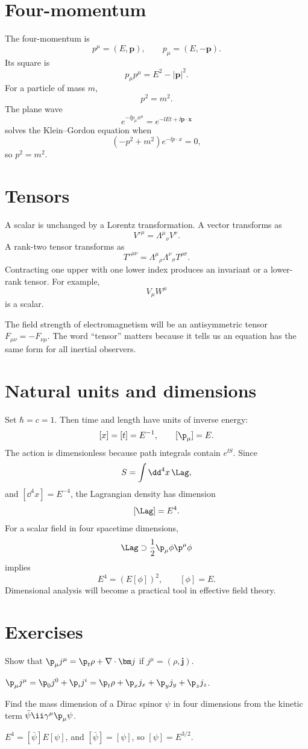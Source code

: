 \section{Four-momentum}

The four-momentum is
\[
  p^\mu=(E,\bm p),\qquad p_\mu=(E,-\bm p).
\]
Its square is
\[
  p_\mu p^\mu=E^2-|\bm p|^2.
\]
For a particle of mass \(m\),
\[
  p^2=m^2.
\]
The plane wave
\[
  e^{-\ii p_\mu x^\mu}=e^{-\ii Et+\ii\bm p\cdot\bm x}
\]
solves the Klein--Gordon equation when
\[
  (-p^2+m^2)e^{-\ii p\cdot x}=0,
\]
so \(p^2=m^2\).

\section{Tensors}

A scalar is unchanged by a Lorentz transformation.  A vector transforms as
\[
  V'^\mu=\Lambda^\mu{}_\nu V^\nu.
\]
A rank-two tensor transforms as
\[
  T'^{\mu\nu}
  =
  \Lambda^\mu{}_\rho\Lambda^\nu{}_\sigma T^{\rho\sigma}.
\]
Contracting one upper with one lower index produces an invariant or a lower-rank tensor.  For example,
\[
  V_\mu W^\mu
\]
is a scalar.

The field strength of electromagnetism will be an antisymmetric tensor \(F_{\mu\nu}=-F_{\nu\mu}\).  The word ``tensor'' matters because it tells us an equation has the same form for all inertial observers.

\section{Natural units and dimensions}

Set \(\hbar=c=1\).  Then time and length have units of inverse energy:
\[
  [x]=[t]=E^{-1},\qquad [\p_\mu]=E.
\]
The action is dimensionless because path integrals contain \(e^{\ii S}\).  Since
\[
  S=\int\dd^4x\,\Lag,
\]
and \([\dd^4x]=E^{-4}\), the Lagrangian density has dimension
\[
  [\Lag]=E^4.
\]
For a scalar field in four spacetime dimensions,
\[
  \Lag\supset \frac12\p_\mu\phi\p^\mu\phi
\]
implies
\[
  E^4=(E[\phi])^2,
  \qquad [\phi]=E.
\]
Dimensional analysis will become a practical tool in effective field theory.

\section*{Exercises}

\begin{exercise}
Show that \(\p_\mu j^\mu=\p_t\rho+\nabla\cdot\bm j\) if \(j^\mu=(\rho,\bm j)\).
\begin{answer}
\(\p_\mu j^\mu=\p_0j^0+\p_ij^i=\p_t\rho+\p_xj_x+\p_yj_y+\p_zj_z\).
\end{answer}
\end{exercise}

\begin{exercise}
Find the mass dimension of a Dirac spinor \(\psi\) in four dimensions from the kinetic term \(\bar\psi\ii\gamma^\mu\p_\mu\psi\).
\begin{answer}
\(E^4=[\bar\psi]E[\psi]\), and \([\bar\psi]=[\psi]\), so \([\psi]=E^{3/2}\).
\end{answer}
\end{exercise}

